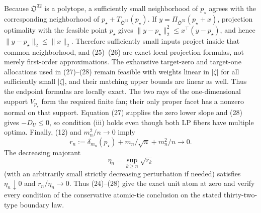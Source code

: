 Because \(\mathfrak O^{32}\) is a polytope, a sufficiently small neighborhood of \(p_\star\) agrees with the corresponding neighborhood of \(p_\star+T_{\mathfrak O^{32}}(p_\star)\).  If \(y=\Pi_{\mathfrak O^{32}}(p_\star+x)\), projection optimality with the feasible point \(p_\star\) gives \(\|y-p_\star\|_2^2\leq x^{\top}(y-p_\star)\), and hence \(\|y-p_\star\|_2\leq\|x\|_2\).  Therefore sufficiently small inputs project inside that common neighborhood, and (25)--(26) are exact local projection formulas, not merely first-order approximations.  The exhaustive target-zero and target-one allocations used in (27)--(28) remain feasible with weights linear in \(|\zeta|\) for all sufficiently small \(|\zeta|\), and their matching upper bounds are linear as well.  Thus the endpoint formulas are locally exact.  The two rays of the one-dimensional support \(V_{p_\star}\) form the required finite fan; their only proper facet has a nonzero normal on that support.  Equation (27) supplies the zero lower slope and (28) gives \(-D_U\leq0\), so condition (iii) holds even though both LP fibers have multiple optima.  Finally, (12) and \(m_n^2/n\to0\) imply
\[
r_n:=\delta_{m_n}(p_\star)+m_n/\sqrt n+m_n^2/n\longrightarrow0.
\]
The decreasing majorant
\[
\eta_n=\sup_{k\geq n}\sqrt{r_k}
\]
(with an arbitrarily small strictly decreasing perturbation if needed) satisfies \(\eta_n\downarrow0\) and \(r_n/\eta_n\to0\).  Thus (24)--(28) give the exact unit atom at zero and verify every condition of the conservative atomic-tie conclusion on the stated thirty-two-type boundary law.